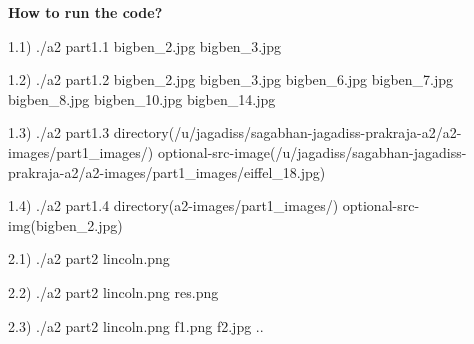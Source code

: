 \documentclass{article}
\begin{document}
\begin{enumerate}
\begin{figure}
		\hspace{20px}
		\hspace{20px}
		\end{figure}
		
	\end{enumerate}
	
\textbf{How to run the code?} \newline

1.1) ./a2 part1.1 bigben\_2.jpg bigben\_3.jpg \newline

1.2) ./a2 part1.2 bigben\_2.jpg bigben\_3.jpg bigben\_6.jpg bigben\_7.jpg bigben\_8.jpg bigben\_10.jpg bigben\_14.jpg \newline

1.3) ./a2 part1.3 directory(/u/jagadiss/sagabhan-jagadiss-prakraja-a2/a2-images/part1\_images/) optional-src-image(/u/jagadiss/sagabhan-jagadiss-prakraja-a2/a2-images/part1\_images/eiffel\_18.jpg)\newline

1.4) ./a2 part1.4 directory(a2-images/part1\_images/) optional-src-img(bigben\_2.jpg)\newline

2.1) ./a2 part2 lincoln.png \newline

2.2) ./a2 part2 lincoln.png res.png \newline

2.3) ./a2 part2 lincoln.png f1.png f2.jpg  ..\newline

	
\end{document}

